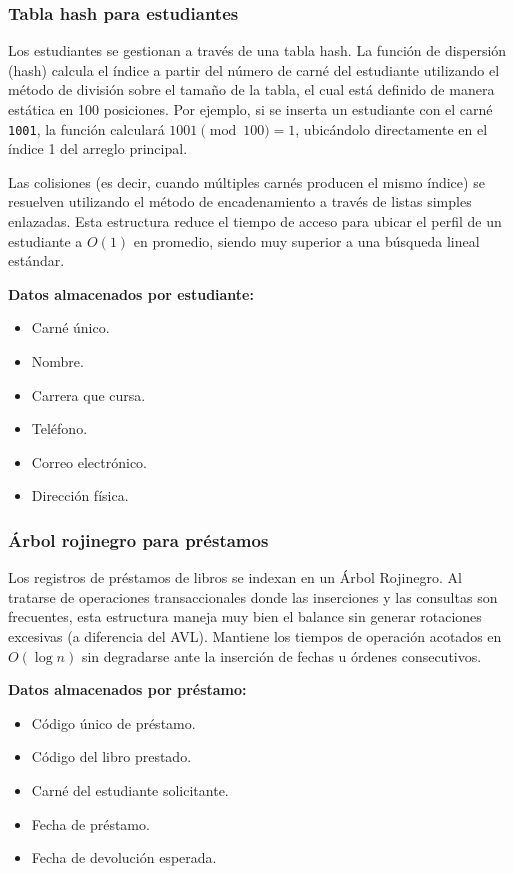 \documentclass[11pt]{article}
\begin{document}
\subsubsection{Tabla hash para estudiantes}

Los estudiantes se gestionan a través de una tabla hash. La función de dispersión (hash) calcula el índice a partir del número de carné del estudiante utilizando el método de división sobre el tamaño de la tabla, el cual está definido de manera estática en 100 posiciones. Por ejemplo, si se inserta un estudiante con el carné \texttt{1001}, la función calculará $1001 \pmod{100} = 1$, ubicándolo directamente en el índice 1 del arreglo principal.

Las colisiones (es decir, cuando múltiples carnés producen el mismo índice) se resuelven utilizando el método de encadenamiento a través de listas simples enlazadas. Esta estructura reduce el tiempo de acceso para ubicar el perfil de un estudiante a $O(1)$ en promedio, siendo muy superior a una búsqueda lineal estándar.

\textbf{Datos almacenados por estudiante:}
\begin{itemize}[noitemsep]
    \item Carné único.
    \item Nombre.
    \item Carrera que cursa.
    \item Teléfono.
    \item Correo electrónico.
    \item Dirección física.
\end{itemize}

\subsubsection{Árbol rojinegro para préstamos}

Los registros de préstamos de libros se indexan en un Árbol Rojinegro. Al tratarse de operaciones transaccionales donde las inserciones y las consultas son frecuentes, esta estructura maneja muy bien el balance sin generar rotaciones excesivas (a diferencia del AVL). Mantiene los tiempos de operación acotados en $O(\log n)$ sin degradarse ante la inserción de fechas u órdenes consecutivos.

\textbf{Datos almacenados por préstamo:}
\begin{itemize}[noitemsep]
    \item Código único de préstamo.
    \item Código del libro prestado.
    \item Carné del estudiante solicitante.
    \item Fecha de préstamo.
    \item Fecha de devolución esperada.
\end{itemize}
\end{document}
